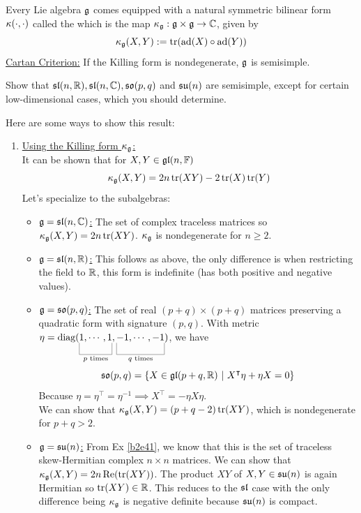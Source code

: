 \documentclass[10pt]{article}
\begin{document}
\begin{definition}
	Every Lie algebra $\mathfrak{g}$ comes equipped with a natural symmetric bilinear form $\kappa\lparen\cdot,\cdot\rparen$ called the  which is the map $\kappa_{\mathfrak{g}} : \mathfrak{g} \times \mathfrak{g} \to \mathbb{C}$, given by
	$$
		\kappa_{\mathfrak{g}}\lparen X, Y\rparen := \tr\lparen\text{ad} \lparen X\rparen \circ \text{ad} \lparen Y\rparen\rparen
	$$
	\underline{Cartan Criterion:} If the Killing form is nondegenerate, $\mathfrak{g}$ is semisimple.
\end{definition}


\begin{example}
	Show that $\mathfrak{sl}(n,\mathbb{R}), \mathfrak{sl}(n,\mathbb{C}), \mathfrak{so}(p,q)$ and $\mathfrak{su}(n)$ are semisimple, except for certain low-dimensional cases, which you should determine.
\end{example}
\sol Here are some ways to show this result:
\begin{enumerate}
	\item \underline{Using the Killing form $\kappa_{\mathfrak{g}}$:}\\
		It can be shown that for $X, Y \in \mathfrak{gl}(n,\mathbb{F})$
		$$
			\kappa_{\mathfrak{g}}(X, Y) = 2n\tr(XY) - 2\tr(X)\tr(Y)
		$$
		Let's specialize to the subalgebras:
		\begin{itemize}
			\item \underline{$\mathfrak{g} = \mathfrak{sl}(n,\mathbb{C})$:} The set of complex traceless matrices so $\kappa_{\mathfrak{g}}(X, Y) = 2n\tr(XY)$. $\kappa_{\mathfrak{g}}$ is nondegenerate for $n \ge 2$.
			\item \underline{$\mathfrak{g} = \mathfrak{sl}(n,\mathbb{R})$:} This follows as above, the only difference is when restricting the field to $\mathbb{R}$, this form is indefinite (has both positive and negative values).
			\item \underline{$\mathfrak{g} = \mathfrak{so}(p,q)$:} The set of real $(p+q)\times(p+q)$ matrices preserving a quadratic form with signature $(p,q)$. With metric $\eta = \diag(\ub{1,\cdots,1}{p\text{ times}}, \ub{-1,\cdots,-1}{q\text{ times}})$, we have
			$$
				\mathfrak{so}(p,q) = \lbrace X \in \mathfrak{gl}(p+q, \mathbb{R}) ~|~ X^\intercal\eta + \eta X = 0\rbrace
			$$
			Because $\eta = \eta^\intercal = \eta^{-1} \implies X^\intercal = -\eta X\eta$.\\
			We can show that $\kappa_{\mathfrak{g}}(X, Y) = (p+q-2)\tr(XY)$, which is nondegenerate for $p+q > 2$.
			\item \underline{$\mathfrak{g} = \mathfrak{su}(n)$:} From Ex \ref{b2e41}, we know that this is the set of traceless skew-Hermitian complex $n\times n$ matrices. We can show that $\kappa_{\mathfrak{g}}(X, Y) = 2n\Re(\tr(XY))$. The product $XY$ of $X, Y\in \mathfrak{su}(n)$ is again Hermitian so $\tr(XY) \in \mathbb{R}$. This reduces to the $\mathfrak{sl}$ case with the only difference being $\kappa_{\mathfrak{g}}$ is negative definite because $\mathfrak{su}(n)$ is compact.

\end{itemize}
\end{enumerate}
\end{document}

